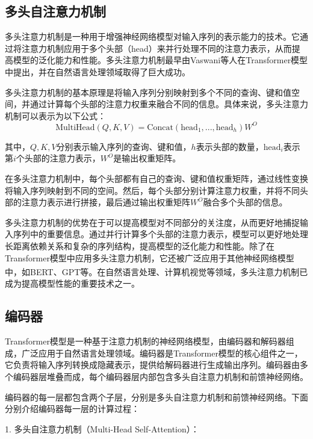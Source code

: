 \subsection{多头自注意力机制}
多头注意力机制是一种用于增强神经网络模型对输入序列的表示能力的技术。它通过将注意力机制应用于多个头部（head）来并行处理不同的注意力表示，从而提高模型的泛化能力和性能。多头注意力机制最早由Vaswani等人在Transformer模型中提出，并在自然语言处理领域取得了巨大成功。

多头注意力机制的基本原理是将输入序列分别映射到多个不同的查询、键和值空间，并通过计算每个头部的注意力权重来融合不同的信息。具体来说，多头注意力机制可以表示为以下公式：
\begin{equation}
	\text{MultiHead}(Q, K, V) = \text{Concat}(\text{head}_1, ..., \text{head}_h)W^O
\end{equation}



其中，$Q, K, V$分别表示输入序列的查询、键和值，$h$表示头部的数量，$\text{head}_i$表示第$i$个头部的注意力表示，$W^O$是输出权重矩阵。

在多头注意力机制中，每个头部都有自己的查询、键和值权重矩阵，通过线性变换将输入序列映射到不同的空间。然后，每个头部分别计算注意力权重，并将不同头部的注意力表示进行拼接，最后通过输出权重矩阵$W^O$融合多个头部的信息。

多头注意力机制的优势在于可以提高模型对不同部分的关注度，从而更好地捕捉输入序列中的重要信息。通过并行计算多个头部的注意力表示，模型可以更好地处理长距离依赖关系和复杂的序列结构，提高模型的泛化能力和性能。除了在Transformer模型中应用多头注意力机制，它还被广泛应用于其他神经网络模型中，如BERT\textsuperscript{\cite{kenton2019bert}}、GPT\textsuperscript{\cite{floridi2020gpt}}等。在自然语言处理、计算机视觉等领域，多头注意力机制已成为提高模型性能的重要技术之一。
 
\subsection{编码器}
Transformer模型是一种基于注意力机制的神经网络模型，由编码器和解码器组成，广泛应用于自然语言处理领域。编码器是Transformer模型的核心组件之一，它负责将输入序列转换成隐藏表示，提供给解码器进行生成输出序列。编码器由多个编码器层堆叠而成，每个编码器层内部包含多头自注意力机制和前馈神经网络。

编码器的每一层都包含两个子层，分别是多头自注意力机制和前馈神经网络。下面分别介绍编码器每一层的计算过程：

1. 多头自注意力机制（Multi-Head Self-Attention）：

